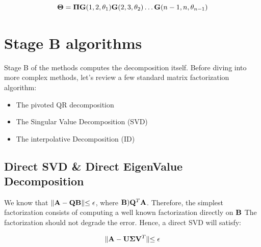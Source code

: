 \documentclass[onecolumn,12pt]{article}
\begin{document}
\begin{equation}
\label{givens_rotation}
\bold{\Theta} = \bold{\Pi} \bold{G}(1, 2, \theta_1) \bold{G}(2, 3, \theta_2) \dots
\bold{G}(n - 1, n, \theta_{n-1})
\end{equation}


\section{Stage B algorithms}

Stage B of the methods computes the decomposition itself. Before diving into
more complex methods, let's review a few standard matrix factorization
algorithm:

\begin{itemize}
\item The pivoted QR decomposition
\item The Singular Value Decomposition (SVD)
\item The interpolative Decomposition (ID)
\end{itemize}

\subsection{Direct SVD \& Direct EigenValue Decomposition}

We know that $\lVert \bold{A} - \bold{Q} \bold{B} \lVert \leq \epsilon$, where
$\bold{B} ) \bold{Q}^T \bold{A}$. Therefore, the simplest factorization
consists of computing a well known factorization directly on $\bold{B}$
The factorization should not degrade the error. Hence, a direct SVD will
satisfy:

\begin{equation}
\lVert \bold{A} - \bold{U} \bold{\Sigma}\bold{V}^T \lVert \leq \epsilon
\end{equation}

\noindent{}
\end{document}
